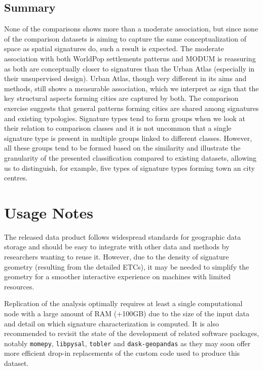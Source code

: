 \documentclass[fleqn,10pt]{wlscirep}
\begin{document}
\subsection*{Summary}
None of the comparisons shows more than a moderate association, but since none of the
comparison datasets is aiming to capture the same conceptualization of space as spatial
signatures do, such a result is expected. The moderate association with both WorldPop
settlements patterns and MODUM is reassuring as both are conceptually closer to
signatures than the Urban Atlas (especially in their unsupervised design). Urban Atlas,
though very different in its aims and methods, still shows a measurable association,
which we interpret as sign that the key structural aspects forming cities are captured by both. The
comparison exercise suggests that general patterns forming cities are shared among
signatures and existing typologies. Signature types tend to form groups when we look at
their relation to comparison classes and it is not uncommon that a single signature type
is present in multiple groups linked to different classes. However, all these groups
tend to be formed based on the similarity and illustrate the granularity of the
presented classification compared to existing datasets, allowing us to distinguish, for
example, five types of signature types forming town an city centres.


\section*{Usage Notes}

The released data product follows widespread standards for geographic data storage and
should be easy to integrate with other data and methods by researchers wanting to reuse it. However, due to the density of
signature geometry (resulting from the detailed ETCs), it may be needed to simplify the
geometry for a smoother interactive experience on machines with limited resources.

Replication of the analysis optimally requires at least a single computational node with
a large amount of RAM (+100GB) due to the size of the input data and detail on which
signature characterization is computed. It is also recommended to revisit the state of
the development of related software packages, notably
\texttt{momepy}\cite{fleischmann_2019}, \texttt{libpysal}\cite{rey2021pysal},
\texttt{tobler}\cite{eli_knaap_2021_5047613} and
\texttt{dask-geopandas} as they may soon offer more efficient drop-in replacements
of the custom code used to produce this dataset.
\end{document}
